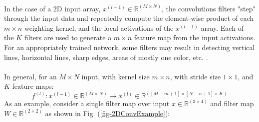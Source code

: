 \documentclass[12pt,letterpaper]{article}
\begin{document}
\paragraph*{}In the case of a 2D input array, $x^{(l-1)} \in \mathbb{R}^{(M \times N)}$, the convolutions filters "step" through the input data and repeatedly compute the element-wise product of each $m \times n$ weighting kernel, and the local activations of the $x^{(l-1)}$ array. Each of the $K$ filters are used to generate a $m \times n$ feature map from the input activations. For an appropriately trained network, some filters may result in detecting vertical lines, horizontal lines, sharp edges, areas of mostly one color, etc. \cite{Geron,Loy}.

\paragraph*{}In general, for an $M \times N$ input, with kernel size $m \times n$, with stride size $1 \times 1$, and $K$ feature maps:
\begin{equation}
f^{(l)} : x^{(l-1)} \in \mathbb{R}^{(M \times N)} \rightarrow
x^{(l)} \in \mathbb{R}^{([M-m+1] \times [N-n+1] \times K)}
\end{equation}
As an example, consider a single filter map over input $x \in \mathbb{R}^{(3 \times 4)}$ and filter map $W \in \mathbb{R}^{(2 \times 2)}$ as shown in Fig. (\ref{fig-2DConvExample}):
\end{document}
